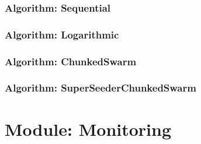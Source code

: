 \subsubsection{Algorithm: Sequential}
\label{subsubsec:sequential}

\subsubsection{Algorithm: Logarithmic}
\label{subsubsec:logarithmic}

\subsubsection{Algorithm: ChunkedSwarm}
\label{subsubsec:chunkedswarm}

\subsubsection{Algorithm: SuperSeederChunkedSwarm}
\label{subsubsec:superseederchunkedswarm}

\cleardoublepage
\section{Module: Monitoring}
\label{sec:monitoring}

